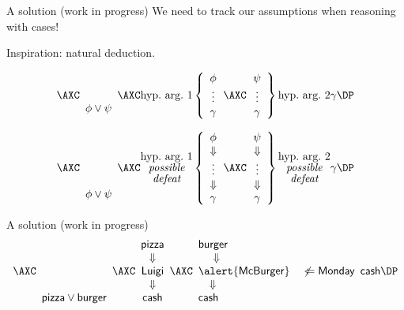 \documentclass[aspectratio=169]{beamer}
\begin{document}
\begin{frame}[label={sec:org6b86e0c}]{A solution (work in progress)}
We need to track our assumptions when reasoning with cases!

Inspiration: natural deduction.

\[
\axs{\array{c} \phantom{M} \\ \phantom{M} \\ \phi \vee \psi \endarray}
\axs{\mbox{hyp.~arg.~1} \left\{ \array{c} \phi \\ \vdots \\ \gamma \endarray \right.}
\axs{\left. \array{c} \psi \\ \vdots \\ \gamma \endarray \right\} \mbox{hyp.~arg.~2} }
\irl3{RbC}{\gamma}
\DP
\]

\pause

\[
\axs{\array{c} \phantom{M} \\ \phantom{M} \\ \phantom{M} \\ \phantom{M} \\ \phi \vee \psi \endarray}
\axs{\substack{\mbox{hyp.~arg.~1} \\ \mbox{\it possible} \\ \mbox{\it defeat}} \left\{ \array{c} \phi \\ \Downarrow \\ \vdots \\ \Downarrow \\ \gamma \endarray \right.}
\axs{\left. \array{c} \psi \\ \Downarrow \\ \vdots \\ \Downarrow \\ \gamma \endarray \right\} \substack{\mbox{hyp.~arg.~2} \\ \mbox{\it possible} \\ \mbox{\it defeat}} }
\irl3{RbC}{\gamma}
\DP
\]
\end{frame}
\begin{frame}[label={sec:org0c5900f}]{A solution (work in progress)}
\[
\axs{\array{c} \phantom{M} \\ \phantom{M} \\ \phantom{M} \\ \phantom{M} \\ \mathsf{pizza} \vee \mathsf{burger} \endarray}
\axs{\array{c} \mathsf{pizza} \\ \Downarrow \\ \mathsf{Luigi} \\ \Downarrow \\ \mathsf{cash} \endarray}
\axs{\array{l} \mathsf{burger} \\ ~~~~\Downarrow \\ \alert{\mathsf{McBurger}} \quad \not\Leftarrow \mathsf{Monday} \\ ~~~\Downarrow \\ \mathsf{cash} \endarray}
\irl3{RbC}{\mathsf{cash}}
\DP
\]
\end{frame}
\end{document}

